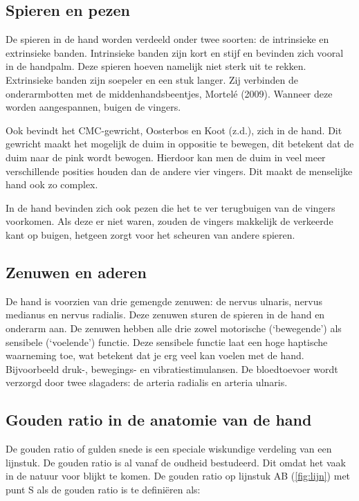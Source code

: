 \hypertarget{spieren-en-pezen}{%
\subsection{Spieren en pezen}\label{spieren-en-pezen}}

De spieren in de hand worden verdeeld onder twee soorten: de intrinsieke
en extrinsieke banden. Intrinsieke banden zijn kort en stijf en bevinden
zich vooral in de handpalm. Deze spieren hoeven namelijk niet sterk uit
te rekken. Extrinsieke banden zijn soepeler en een stuk langer. Zij
verbinden de onderarmbotten met de middenhandsbeentjes, Mortelé (2009).
Wanneer deze worden aangespannen, buigen de vingers.

Ook bevindt het CMC-gewricht, Oosterbos en Koot (z.d.), zich in de hand.
Dit gewricht maakt het mogelijk de duim in oppositie te bewegen, dit
betekent dat de duim naar de pink wordt bewogen. Hierdoor kan men de
duim in veel meer verschillende posities houden dan de andere vier
vingers. Dit maakt de menselijke hand ook zo complex.

In de hand bevinden zich ook pezen die het te ver terugbuigen van de
vingers voorkomen. Als deze er niet waren, zouden de vingers makkelijk
de verkeerde kant op buigen, hetgeen zorgt voor het scheuren van andere
spieren.

\hypertarget{zenuwen-en-aderen}{%
\subsection{Zenuwen en aderen}\label{zenuwen-en-aderen}}

De hand is voorzien van drie gemengde zenuwen: de nervus ulnaris, nervus
medianus en nervus radialis. Deze zenuwen sturen de spieren in de hand
en onderarm aan. De zenuwen hebben alle drie zowel motorische
(`bewegende') als sensibele (`voelende') functie. Deze sensibele functie
laat een hoge haptische waarneming toe, wat betekent dat je erg veel kan
voelen met de hand. Bijvoorbeeld druk-, bewegings- en
vibratiestimulansen. De bloedtoevoer wordt verzorgd door twee slagaders:
de arteria radialis en arteria ulnaris.

\hypertarget{gouden-ratio-in-de-anatomie-van-de-hand}{%
\subsection{Gouden ratio in de anatomie van de
hand}\label{gouden-ratio-in-de-anatomie-van-de-hand}}

De gouden ratio of gulden snede is een speciale wiskundige verdeling van
een lijnstuk. De gouden ratio is al vanaf de oudheid bestudeerd. Dit
omdat het vaak in de natuur voor blijkt te komen. De gouden ratio op
lijnstuk AB (\cref{fig:lijn}) met punt S als de gouden
ratio is te definiëren als:

